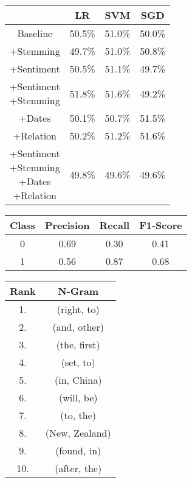 \documentclass[11pt,a4paper]{article}
\begin{document}
\begin{center}
\begin{tabular}{ |c|c|c|c| }
 \hline
  & LR & SVM & SGD \\
  \hline
  Baseline & 50.5\% & 51.0\% & 50.0\% \\
  \hline
 +Stemming & 49.7\% & 51.0\% & 50.8\% \\
  \hline
 +Sentiment & 50.5\% & 51.1\%  & 49.7\% \\
  \hline
  \shortstack{+Sentiment \\ +Stemming} & 51.8\% & 51.6\% & 49.2\%\\
 \hline
 +Dates & 50.1\% & 50.7\% & 51.5\% \\
  \hline
 +Relation & 50.2\% & 51.2\% & 51.6\% \\
  \hline
  \shortstack{+Sentiment \\ +Stemming \\+Dates \\+Relation} & 49.8\% & 49.6\% & 49.6\% \\
 \hline
\end{tabular}
\end{center}

\begin{center}
\begin{tabular}{ |c|c|c|c| }
 \hline
  Class & Precision & Recall & F1-Score\\
  \hline
  0 & 0.69 & 0.30 & 0.41\\
  \hline
  1 & 0.56 & 0.87 & 0.68\\
 \hline
\end{tabular}
\end{center}

\begin{center}
\begin{tabular}{ |c|c| }
 \hline
 Rank & N-Gram\\
 \hline
 1. & (right, to)\\
 2. & (and, other)\\
 3. & (the, first)\\
 4. & (set, to)\\
 5. & (in, China)\\
 6. & (will, be)\\
 7. & (to, the)\\
 8. & (New, Zealand)\\
 9. & (found, in)\\
 10. & (after, the)\\
 \hline
\end{tabular}
\end{center}
\end{document}
